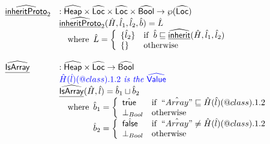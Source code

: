 \[\begin{array}{ll}
\widehat{\underline{\sf inheritProto}}_2 &:  \widehat{\mbox{\textsf{Heap}}} \times \widehat{\mbox{\textsf{Loc}}} \times \widehat{\mbox{\textsf{Loc}}} \times \widehat{\mbox{\textsf{Bool}}} \rightarrow \wp(\widehat{\mbox{\textsf{Loc}}})\\
& \widehat{\underline{\sf inheritProto}}_2 (\hat{H}, \hat{l}_1, \hat{l}_2, \hat{b}) = \hat{L}\\
& \quad {\rm where}\begin{array}[t]{l}
  \hat{L} = \left\{
    \begin{array}{ll}
      \{ \hat{l}_2 \} & {\rm if}\begin{array}[t]{l} \hat{b} \sqsubseteq \widehat{\underline{\sf inherit}}(\hat{H}, \hat{l}_1, \hat{l}_2)\end{array}\\
      \{ \} & {\rm otherwise}\\
    \end{array}
  \right.\\
\end{array}
\\

\\


\widehat{\underline{\sf IsArray}} & : \widehat{\mbox{\textsf{Heap}}} \times \widehat{\mbox{\textsf{Loc}}} \rightarrow \widehat{\mbox{\textsf{Bool}}} \\
& {\color{blue} \hat{H}(\hat{l})(@class).1.2\textit{ is the }\widehat{\mbox{\textsf{Value}}}} \\
& \widehat{\underline{\sf IsArray}}(\hat{H},\hat{l}) = \hat{b}_1\sqcup\hat{b}_2\\
& \quad{\rm where}\begin{array}[t]{l}
    \hat{b}_1=\left\{
      \begin{array}{ll}
        \hat{\mbox{\textsf{true}}} &{\rm if}\begin{array}[t]{l}\hat{``Array"} \sqsubseteq \hat{H}(\hat{l})(@class).1.2\end{array}\\
        \bot_{Bool} & {\rm otherwise} \\
      \end{array}
    \right.\\
    \hat{b}_2 = \left\{
      \begin{array}{ll}
        \hat{\mbox{\textsf{false}}} & {\rm if}\begin{array}[t]{l}\hat{``Array"} \neq \hat{H}(\hat{l})(@class).1.2\end{array}\\
        \bot_{Bool} & {\rm otherwise}\\
      \end{array}
    \right.\\
  \end{array}\\
\\


\end{array}\]
